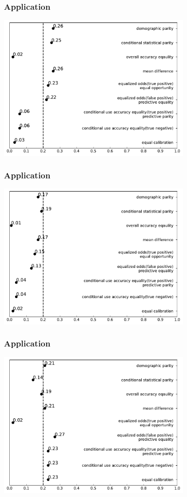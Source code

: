 \documentclass{beamer}
\begin{document}
\begin{frame}
    \frametitle{Application}
    \centering
    \includegraphics[width=0.73\textwidth]{African-American}
\end{frame}

\begin{frame}
    \frametitle{Application}
    \centering
    \includegraphics[width=0.73\textwidth]{Caucasian}
\end{frame}

\begin{frame}
    \frametitle{Application}
    \centering
    \includegraphics[width=0.73\textwidth]{Asian}
\end{frame}
\end{document}
